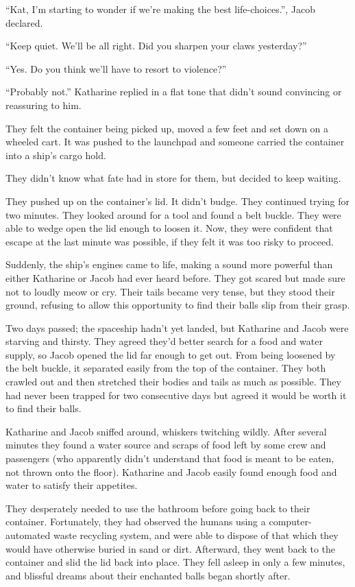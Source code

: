 “Kat, I'm starting to wonder if we're making the best life-choices.”, Jacob declared.

“Keep quiet. We'll be all right. Did you sharpen your claws yesterday?”

“Yes. Do you think we'll have to resort to violence?”

“Probably not.” Katharine replied in a flat tone that didn't sound convincing or reassuring to him.

They felt the container being picked up, moved a few feet and set down on a wheeled cart. It was pushed to the launchpad and someone carried the container into a ship's cargo hold.

They didn't know what fate had in store for them, but decided to keep waiting.

They pushed up on the container's lid. It didn't budge. They continued trying for two minutes. They looked around for a tool and found a belt buckle. They were able to wedge open the lid enough to loosen it. Now, they were confident that escape at the last minute was possible, if they felt it was too risky to proceed.

Suddenly, the ship's engines came to life, making a sound more powerful than either Katharine or Jacob had ever heard before. They got scared but made sure not to loudly meow or cry. Their tails became very tense, but they stood their ground, refusing to allow this opportunity to find their balls slip from their grasp. %

\timesep

Two days passed; the spaceship hadn't yet landed, but Katharine and Jacob were starving and thirsty. They agreed they'd better search for a food and water supply, so Jacob opened the lid far enough to get out. From being loosened by the belt buckle, it separated easily from the top of the container. They both crawled out and then stretched their bodies and tails as much as possible. They had never been trapped for two consecutive days but agreed it would be worth it to find their balls.

Katharine and Jacob sniffed around, whiskers twitching wildly. After several minutes they found a water source and scraps of food left by some crew and passengers (who apparently didn't understand that food is meant to be eaten, not thrown onto the floor). Katharine and Jacob easily found enough food and water to satisfy their appetites.

They desperately needed to use the bathroom before going back to their container. Fortunately, they had observed the humans using a computer-automated waste recycling system, and were able to dispose of that which they would have otherwise buried in sand or dirt. Afterward, they went back to the container and slid the lid back into place. They fell asleep in only a few minutes, and blissful dreams about their enchanted balls began shortly after.


